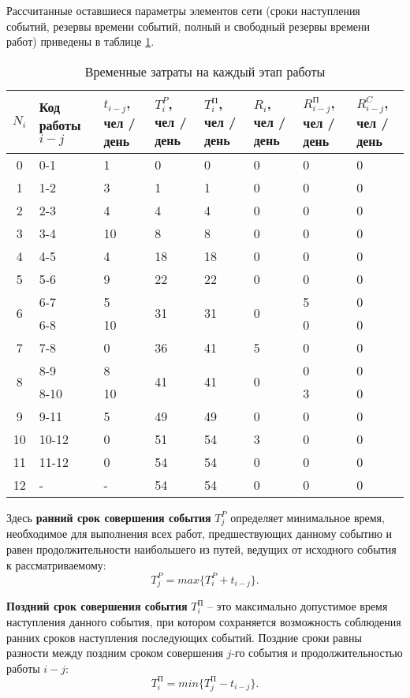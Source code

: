 Рассчитанные оставшиеся параметры элементов сети (сроки наступления событий, резервы времени событий, полный и свободный резервы времени работ) приведены в таблице \ref{table:time_per_work}.
\begin{table} [h!]
  \centering
  \parbox{15cm}{\caption{Временные затраты на каждый этап работы}\label{table:time_per_work}}
 \begin{center}
  \begin{tabular}{| c | m{1.5cm} | m{1.5cm} | m{1.5cm} | m{1.5cm} | m{1.5cm} | m{1.5cm} | m{1.5cm} |}
  \hline
 \rowcolor{Gray} $N_i$  &\centering Код работы $i-j$ &\centering $t_{i-j}$, чел / день &\centering  $T_i^P$, чел / день &\centering $T_i^\textrm{П}$, чел / день &\centering $R_i$, чел / день &\centering $R_{i-j}^\textrm{П}$, чел / день &\centering $R_{i-j}^C$, чел / день \tabularnewline \hline

 0 & 0-1 & 1 & 0 & 0 & 0 & 0 & 0 \tabularnewline \hline
 1 & 1-2 & 3 & 1 & 1 & 0 & 0 & 0 \tabularnewline \hline
 2 & 2-3 & 4 & 4 & 4 & 0 & 0 & 0 \tabularnewline \hline
 3 & 3-4 & 10 & 8 & 8 & 0 & 0 & 0 \tabularnewline \hline
 4 & 4-5 & 4 & 18 & 18 & 0 & 0 & 0 \tabularnewline \hline
 5 & 5-6 & 9 & 22 & 22 & 0 & 0 & 0 \tabularnewline \hline
 \multirow{2}{*}{6} & 6-7 & 5 & \multirow{2}{*}{31} & \multirow{2}{*}{31} & \multirow{2}{*}{0} & 5 & 0 \tabularnewline \cline{2-3} \cline{7-8}
  & 6-8 & 10 & & & & 0 & 0 \tabularnewline \hline
  7 & 7-8 & 0 & 36 & 41 & 5 & 0 & 0 \tabularnewline \hline
\multirow{2}{*}{8} & 8-9 & 8 & \multirow{2}{*}{41} & \multirow{2}{*}{41} & \multirow{2}{*}{0} & 0 & 0 \tabularnewline \cline{2-3} \cline{7-8}
  & 8-10 & 10 & & & & 3 & 0 \tabularnewline \hline
  9 & 9-11 & 5 & 49 & 49 & 0 & 0 & 0 \tabularnewline \hline
  10 & 10-12& 0 & 51 & 54 & 3 & 0 & 0 \tabularnewline \hline
  11 & 11-12 & 0 & 54 & 54 & 0 & 0 & 0 \tabularnewline \hline
  12 & - & - & 54 & 54 & 0 & 0 & 0 \tabularnewline \hline
   \end{tabular}
 \end{center}
\end{table}

Здесь \textbf{ранний срок совершения события} $T_j^P$ определяет минимальное время, необходимое для выполнения всех работ, предшествующих данному событию и равен продолжительности наибольшего из путей, ведущих от исходного события к рассматриваемому:
\begin{equation}
  \label{eq:T_j^P}
T_j^P = max \{ T_i^P + t_{i-j}\}.
\end{equation}

\textbf{Поздний срок совершения события} $T_i^\textrm{П}$ – это максимально допустимое время наступления данного события, при котором сохраняется возможность соблюдения ранних сроков наступления последующих событий. Поздние сроки равны разности между поздним сроком совершения $j$-го события и продолжительностью работы $i-j$:
\begin{equation}
  \label{eq:T_j_late}
T_i^\textrm{П} = min \{ T_j^\textrm{П} - t_{i-j}\}.
\end{equation}

